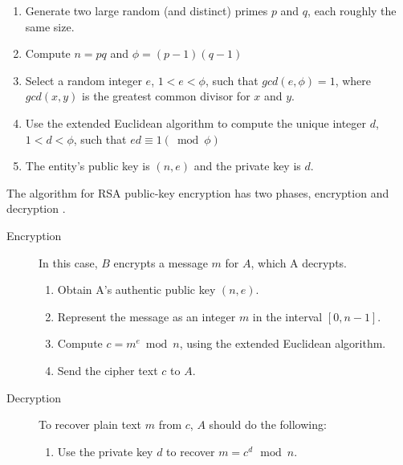 \documentclass[frame, english]{idamasterthesis}
\begin{document}
\begin{enumerate} %
    \item Generate two large random (and distinct) primes $p$ and $q$, each roughly the same size. 
    \item Compute $n=pq$ and $\phi = (p-1)(q-1)$
    \item Select a random integer $e$, $1 < e < \phi$, such that $gcd(e,\phi)=1$, where $gcd(x,y)$ is the greatest common divisor for $x$ and $y$. 
    \item Use the extended Euclidean algorithm to compute the unique integer $d$, $1<d<\phi$, such that $ed \equiv 1 (\bmod \phi)$
    \item The entity's public key
    is $(n,e)$ and the private key is $d$.\hfill \cite{handcrypt}
\end{enumerate}
    The algorithm for RSA public-key encryption has two phases, encryption and decryption \cite{handcrypt}.
\begin{description}
    \item[Encryption] In this case, $B$ encrypts a message $m$ for $A$, which A decrypts.
    \begin{enumerate}
        \item Obtain A's authentic public key $(n,e)$.
        \item Represent the message as an integer $m$ in the interval $[0,n-1]$.
        \item Compute $c=m^e \bmod n$, using the extended Euclidean algorithm.
        \item Send the cipher text $c$ to $A$. 
    \end{enumerate}
            
    \item[Decryption] To recover plain text $m$ from $c$, $A$ should do the following: 
    \begin{enumerate}
        \item Use the private key $d$ to recover $m=c^d \, \bmod n$. \\
    \end{enumerate}
\end{description}
\end{document}
